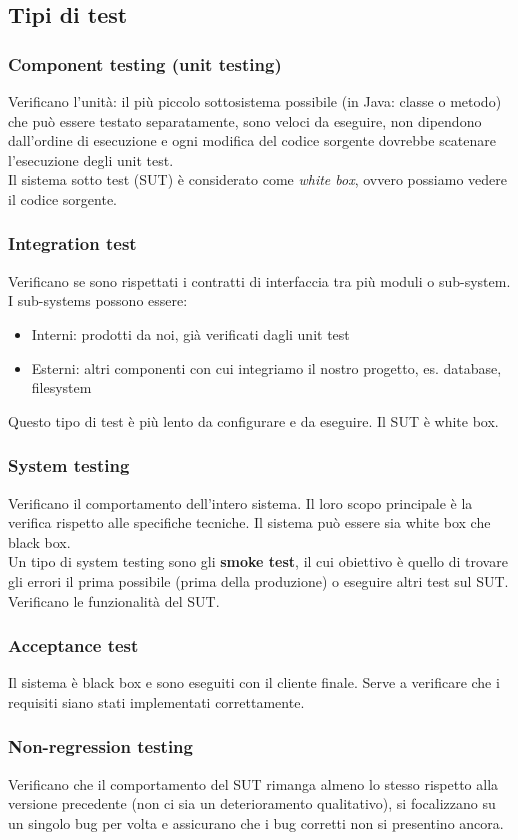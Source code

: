 \documentclass[10pt, a4paper]{article}
\begin{document}
\subsection{Tipi di test}
\subsubsection*{Component testing (unit testing)}
Verificano l’unità: il più piccolo sottosistema possibile (in Java: classe o metodo) che
può essere testato separatamente, sono veloci da eseguire, non dipendono dall'ordine di esecuzione e ogni modifica del codice sorgente dovrebbe scatenare l’esecuzione degli unit test.\\
Il sistema sotto test (SUT) è considerato come \textit{white box}, ovvero possiamo vedere il codice sorgente.

\subsubsection*{Integration test}
Verificano se sono rispettati i contratti di interfaccia tra più moduli o sub-system.\\
I sub-systems possono essere:
\begin{itemize}
    \item Interni: prodotti da noi, già verificati dagli unit test
    \item Esterni: altri componenti con cui integriamo il nostro progetto, es. database, filesystem
\end{itemize}
Questo tipo di test è più lento da configurare e da eseguire. Il SUT è white box.

\subsubsection*{System testing}
Verificano il comportamento dell'intero sistema. Il loro scopo principale è la verifica rispetto alle specifiche tecniche. Il sistema può essere sia white box che black box.\\
Un tipo di system testing sono gli \textbf{smoke test}, il cui obiettivo è quello di trovare gli errori il prima possibile (prima della produzione) o eseguire altri test sul SUT. Verificano le funzionalità del SUT.

\subsubsection*{Acceptance test}
Il sistema è black box e sono eseguiti con il cliente finale. Serve a verificare che i requisiti siano stati implementati correttamente.

\subsubsection*{Non-regression testing}
Verificano che il comportamento del SUT rimanga almeno lo stesso rispetto alla versione precedente (non ci sia un deterioramento qualitativo), si focalizzano su un singolo bug per volta e assicurano che i bug corretti non si presentino ancora.
\end{document}
